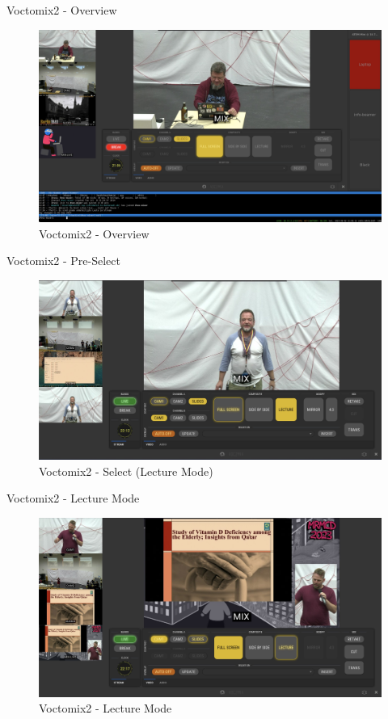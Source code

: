 
\begin{frame}{Voctomix2 - Overview}
	\begin{figure}
		\centering
		\includegraphics[width=.8\textwidth]{images/voctomix2-overview.jpg}
		\caption{Voctomix2 - Overview}
	\end{figure}
\end{frame}

\begin{frame}{Voctomix2 - Pre-Select}
	\begin{figure} 
		\centering
		\includegraphics[width=.9\textwidth]{images/voctomix2-lecture_select.jpg}
		\caption{Voctomix2 - Select (Lecture Mode)}
	\end{figure}
\end{frame}

\begin{frame}{Voctomix2 - Lecture Mode}
	\begin{figure} 
		\centering
		\includegraphics[width=.9\textwidth]{images/voctomix2-lecture.jpg}
		\caption{Voctomix2 - Lecture Mode}
	\end{figure}
\end{frame}

